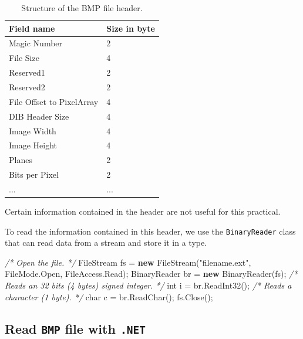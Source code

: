 \documentclass[11pt, a4paper]{article}
\newenvironment{Shaded}{}{}
\newcommand{\KeywordTok}[1]{\textcolor[rgb]{0.00,0.44,0.13}{\textbf{{#1}}}}
\newcommand{\DataTypeTok}[1]{\textcolor[rgb]{0.56,0.13,0.00}{{#1}}}
\newcommand{\StringTok}[1]{\textcolor[rgb]{0.25,0.44,0.63}{{#1}}}
\newcommand{\CommentTok}[1]{\textcolor[rgb]{0.38,0.63,0.69}{\textit{{#1}}}}
\newcommand{\FunctionTok}[1]{\textcolor[rgb]{0.02,0.16,0.49}{{#1}}}
\newcommand{\NormalTok}[1]{{#1}}
\begin{document}
\begin{table}[h]
\begin{center}
\begin{ttfamily}
\begin{tabular}{l||l}
Field name & Size in byte \\
\hline
Magic Number & 2 \\
File Size & 4 \\
Reserved1 & 2 \\
Reserved2 & 2 \\
File Offset to PixelArray & 4 \\
DIB Header Size & 4 \\
Image Width & 4 \\
Image Height & 4 \\
Planes & 2 \\
Bits per Pixel & 2 \\
... & ...
\end{tabular}
\end{ttfamily}
\end{center}
\caption{Structure of the BMP file header.}
\end{table}

Certain information contained in the header are not useful for this
practical.\newline

To read the information contained in this header, we use the
\texttt{BinaryReader} class that can read data from a stream and store
it in a type.

\begin{Shaded}
\begin{Highlighting}[]
\CommentTok{/* Open the file. */}
\NormalTok{FileStream fs = }\KeywordTok{new} \FunctionTok{FileStream}\NormalTok{(}\StringTok{"filename.ext"}\NormalTok{, FileMode.}\FunctionTok{Open}\NormalTok{, FileAccess.}\FunctionTok{Read}\NormalTok{);}
\NormalTok{BinaryReader br = }\KeywordTok{new} \FunctionTok{BinaryReader}\NormalTok{(fs);}
\CommentTok{/* Reads an 32 bits (4 bytes) signed integer. */}
\DataTypeTok{int} \NormalTok{i = br.}\FunctionTok{ReadInt32}\NormalTok{();}
\CommentTok{/* Reads a character (1 byte). */}
\DataTypeTok{char} \NormalTok{c = br.}\FunctionTok{ReadChar}\NormalTok{();}
\NormalTok{fs.}\FunctionTok{Close}\NormalTok{();}
\end{Highlighting}
\end{Shaded}

\subsection{Read \texttt{BMP} file with
\texttt{.NET}}\label{read-bmp-file-with-.net}
\end{document}
